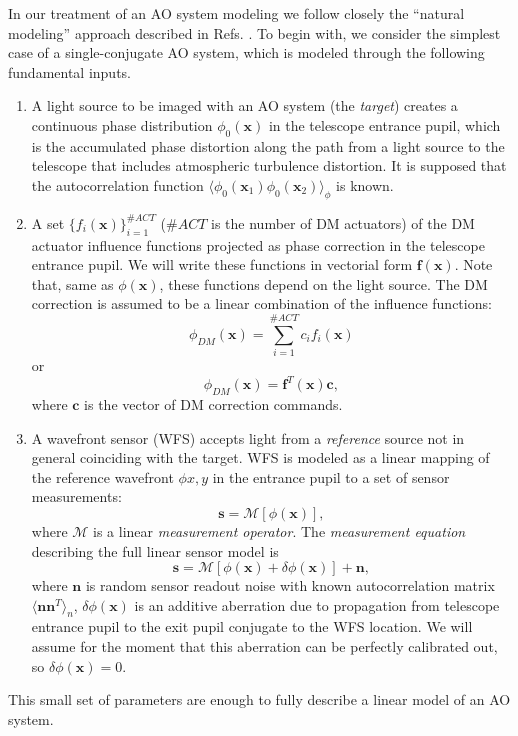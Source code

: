 In our treatment of an AO system modeling we follow closely the ``natural
modeling'' approach described in Refs.
\cite{WibergMaxGavel1,WibergMaxGavel2}. To begin with, we consider the simplest
case of a single-conjugate AO system, which is modeled through the following
fundamental inputs.
\begin{enumerate}
	\item A light source to be imaged with an AO system (the \emph{target})
	creates a continuous phase distribution $\phi_{0}(\bm{x})$ in the
  telescope entrance pupil,
	which is the accumulated phase distortion along the
  path from a light source to the telescope that includes atmospheric
  turbulence distortion. It is supposed that the
  autocorrelation function $\langle \phi_{0}(\bm{x}_{1}) \phi_{0}(\bm{x}_{2})
  \rangle_{\phi}$ is known.
  \item A set $\{ f_{i}(\bm{x}) \}_{i=1}^{\#ACT}$ ($\#ACT$ is the number of DM
  actuators) of the DM actuator influence
  functions projected as phase correction in the telescope entrance pupil. We
  will write these functions in vectorial form $\bm{f}(\bm{x})$. Note that, same
  as $\phi(\bm{x})$, these functions depend on the light source. The DM
  correction is assumed to be a linear combination of the influence functions:
  \begin{equation} \label{eq:dm-phase-correction}
		\phi_{DM}(\bm{x}) = \sum_{i=1}^{\#ACT} c_{i} f_{i}(\bm{x})
	\end{equation}
	or
	$$
	  \phi_{DM}(\bm{x}) = \bm{f}^{T}(\bm{x}) \bm{c},
	$$
	where $\bm{c}$ is the vector of DM correction commands.
  \item A wavefront sensor (WFS) accepts light from a \emph{reference} source
  not in general coinciding with the target. WFS is modeled as a linear
  mapping of the reference wavefront $\phi{x,y}$ in the entrance pupil to a
  set of sensor measurements:
  \begin{equation} \label{eq:wfs-measurement-operator}
    \bm{s} = \mathcal{M} [ \phi(\bm{x}) ],
  \end{equation}
  where $\mathcal{M}$ is a linear \emph{measurement operator}.
   The \emph{measurement equation}
   describing the full linear sensor model is
  \begin{equation} \label{eq:measurement-equation}
	  \bm{s} = \mathcal{M} [ \phi(\bm{x}) + \delta \phi(\bm{x}) ] + \bm{n},
  \end{equation}
  where $\bm{n}$ is random sensor readout noise with known autocorrelation
  matrix $\langle \bm{n} \bm{n}^{T} \rangle_{n}$,
  $\delta \phi(\bm{x})$ is an additive aberration due to propagation from
  telescope entrance pupil to the exit pupil conjugate to the WFS location. We
  will assume for the moment that this aberration can be perfectly calibrated
  out, so $\delta \phi (\bm{x}) = 0$.
\end{enumerate}
This small set of parameters are enough to fully describe a linear model of an
AO system.

